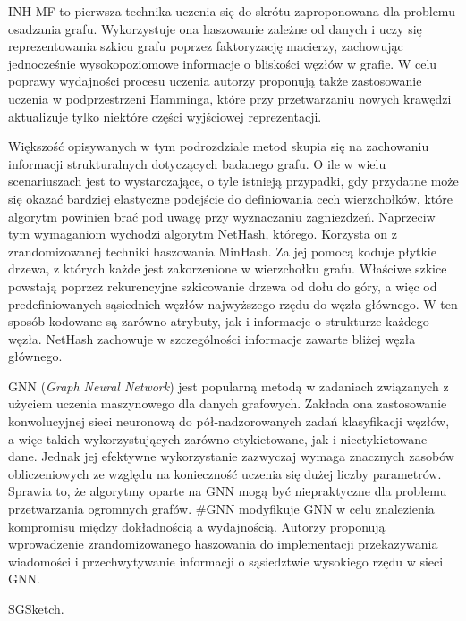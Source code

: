         INH-MF\cite{Lian_Zheng_Zheng_Ge_Cao_Tsang_Xie_2018} to pierwsza technika uczenia się do skrótu zaproponowana dla problemu osadzania grafu. Wykorzystuje ona haszowanie zależne od danych i uczy się reprezentowania szkicu grafu poprzez faktoryzację macierzy, zachowując jednocześnie wysokopoziomowe informacje o bliskości węzłów w grafie. W celu poprawy wydajności procesu uczenia autorzy proponują także zastosowanie uczenia w podprzestrzeni Hamminga, które przy przetwarzaniu nowych krawędzi aktualizuje tylko niektóre części wyjściowej reprezentacji.
        
        Większość opisywanych w tym podrozdziale metod skupia się na zachowaniu informacji strukturalnych dotyczących badanego grafu. O ile w wielu scenariuszach jest to wystarczające, o tyle istnieją przypadki, gdy przydatne może się okazać bardziej elastyczne podejście do definiowania cech wierzchołków, które algorytm powinien brać pod uwagę przy wyznaczaniu zagnieżdzeń. Naprzeciw tym wymaganiom wychodzi algorytm NetHash\cite{Wu_Li_Chen_Zhang_2018}, którego. Korzysta on z zrandomizowanej techniki haszowania MinHash. Za jej pomocą koduje płytkie drzewa, z których każde jest zakorzenione w wierzchołku grafu. Właściwe szkice powstają poprzez rekurencyjne szkicowanie drzewa od dołu do góry, a więc od predefiniowanych sąsiednich węzłów najwyższego rzędu do węzła głównego. W ten sposób kodowane są zarówno atrybuty, jak i informacje o strukturze każdego węzła. NetHash zachowuje w szczególności  informacje zawarte bliżej węzła głównego.
        
        GNN\cite{4700287} (\emph{Graph Neural Network}) jest popularną metodą w zadaniach związanych z użyciem uczenia maszynowego dla danych grafowych. Zakłada ona zastosowanie konwolucyjnej sieci neuronową do pół-nadzorowanych zadań klasyfikacji węzłów, a więc takich wykorzystujących zarówno etykietowane, jak i nieetykietowane dane. Jednak jej efektywne wykorzystanie zazwyczaj wymaga znacznych zasobów obliczeniowych ze względu na konieczność uczenia się dużej liczby parametrów. Sprawia to, że algorytmy oparte na GNN mogą być niepraktyczne dla problemu przetwarzania ogromnych grafów. \#GNN\cite{Wu_Li_Luo_Nejdl_2021} modyfikuje GNN w celu znalezienia kompromisu między dokładnością a wydajnością. Autorzy proponują wprowadzenie zrandomizowanego haszowania do implementacji przekazywania wiadomości i przechwytywanie  informacji o sąsiedztwie wysokiego rzędu w sieci GNN. 
        
        SGSketch\cite{Yang_Qu_Yang_Wang_Cudre-Mauroux_2022}.


